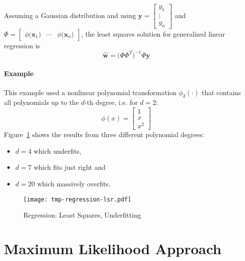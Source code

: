 \documentclass[a4paper, 11pt, accentcolor = tud3b]{tudreport}
\renewcommand{\vec}[1]{\mathbf{#1}}
\begin{document}
			Assuming a Gaussian distribution and using \( \vec{y} = \begin{bmatrix} y_1 \\ \vdots \\ y_n \end{bmatrix} \) and \( \Phi = \begin{bmatrix} \phi\big(\vec{x}_1\big) & \cdots & \phi\big(\vec{x}_n\big) \end{bmatrix} \), the least squares solution for generalized linear regression is
			\begin{equation}
				\hat{\vec{w}} = \big( \Phi \Phi^T \big)^{-1} \Phi \vec{y}
			\end{equation}
			
			\paragraph{Example}
				This example used a nonlinear polynomial transformation \( \phi_d(\cdot) \) that contains all polynomials up to the \(d\)-th degree, i.e. for \( d = 2 \):
				\begin{equation}
					\phi(x) =
						\begin{bmatrix}
							1 \\
							x \\
							x^2
						\end{bmatrix}
				\end{equation}
				Figure~\ref{fig:regressionLsr} shows the results from three different polynomial degrees:
				\begin{itemize}
					\item \(d = 4\) which underfits,
					\item \(d = 7\) which fits just right and
					\item \(d = 20\) which massively overfits.
				\end{itemize}
			
				\begin{figure}
					\centering
					\texttt{[image: tmp-regression-lsr.pdf]}
					\caption{Regression: Least Squares, Underfitting}
					\label{fig:regressionLsr}
				\end{figure}

		\section{Maximum Likelihood Approach}
\end{document}

